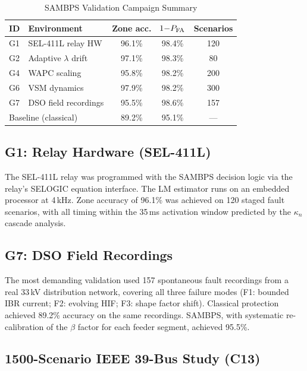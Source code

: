 \documentclass[journal,twoside,10pt]{IEEEtran}
\newcommand{\kappan}{\kappa_{n}}
\begin{document}
\begin{table}[!t]
\caption{SAMBPS Validation Campaign Summary}
\label{tab:validation_summary}
\centering
\renewcommand{\arraystretch}{1.2}
\begin{tabular}{@{}llccc@{}}
\toprule
ID & Environment & Zone acc. & $1{-}P_{\rm FA}$ & Scenarios \\
\midrule
G1 & SEL-411L relay HW & 96.1\% & 98.4\% & 120 \\
G2 & Adaptive $\lambda$ drift & 97.1\% & 98.3\% & 80  \\
G4 & WAPC scaling         & 95.8\% & 98.2\% & 200 \\
G6 & VSM dynamics         & 97.9\% & 98.2\% & 300 \\
G7 & DSO field recordings & 95.5\% & 98.6\% & 157 \\
\midrule
\multicolumn{2}{l}{Baseline (classical)} & 89.2\% & 95.1\% & — \\
\bottomrule
\end{tabular}
\end{table}

\subsection{G1: Relay Hardware (SEL-411L)}

The SEL-411L relay was programmed with the SAMBPS decision logic via
the relay's SELOGIC equation interface.  The LM estimator runs on an
embedded processor at 4\,kHz.  Zone accuracy of 96.1\% was achieved
on 120 staged fault scenarios, with all timing within the 35\,ms
activation window predicted by the $\kappan$ cascade analysis.

\subsection{G7: DSO Field Recordings}

The most demanding validation used 157 spontaneous fault recordings
from a real 33\,kV distribution network, covering all three failure
modes (F1: bounded IBR current; F2: evolving HIF; F3: shape factor
shift).  Classical protection achieved 89.2\% accuracy on the same
recordings.  SAMBPS, with systematic re-calibration of the
$\beta$ factor for each feeder segment, achieved 95.5\%.

\subsection{1500-Scenario IEEE 39-Bus Study (C13)}
\end{document}
